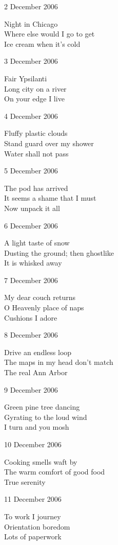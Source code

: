 \documentclass[12pt]{article}
\begin{document}
\newpage

2 December 2006

Night in Chicago \\
Where else would I go to get \\
Ice cream when it's cold

3 December 2006

Fair Ypsilanti \\
Long city on a river \\
On your edge I live

4 December 2006

Fluffy plastic clouds \\
Stand guard over my shower \\
Water shall not pass

5 December 2006

The pod has arrived \\
It seems a shame that I must \\
Now unpack it all

6 December 2006

A light taste of snow \\
Dusting the ground; then ghostlike \\
It is whisked away

7 December 2006

My dear couch returns \\
O Heavenly place of naps \\
Cushions I adore


\newpage

8 December 2006

Drive an endless loop \\
The maps in my head don't match \\
The real Ann Arbor

9 December 2006

Green pine tree dancing \\
Gyrating to the loud wind \\
I turn and you mosh

10 December 2006

Cooking smells waft by \\
The warm comfort of good food \\
True serenity

11 December 2006

To work I journey \\
Orientation boredom \\
Lots of paperwork
\end{document}
